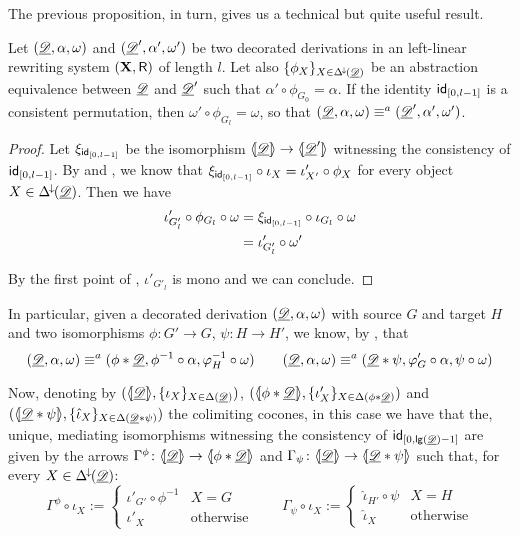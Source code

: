 The previous proposition, in turn, gives us a technical but quite useful result.

\begin{corollary}\label{cor:fromsemitocons}
			Let $(\underline{\mathscr{D}}, \alpha, \omega)$ and $(\underline{\mathscr{D}}', \alpha', \omega')$ be two decorated derivations in an left-linear rewriting system $(\textbf {\textup{X}}, \mathsf{R})$ of length $l$. Let also $\{\phi_X\}_{X\in \Delta^{\hspace{-1pt}\downarrow\hspace{-1pt}}(\underline{\mathscr{D}})}$ be an abstraction equivalence between $\underline{\mathscr{D}}$ and $\underline{\mathscr{D}}'$ such that  $\alpha'\circ \phi_{G_0}=\alpha$. If  the identity $\mathsf{id}_{[0,l-1]}$ is a consistent permutation, then $\omega'\circ \phi_{G_l}=\omega$, so that $(\underline{\mathscr{D}}, \alpha, \omega) \equiv^a (\underline{\mathscr{D}}', \alpha', \omega')$.
\end{corollary}
\begin{proof}
	Let $\xi_{\mathsf{id}_{[0, l-1]}}$ be the isomorphism $\langle \hspace{-1.85pt}[ \underline{\mathscr{D}}]\hspace{-1.85pt}\rangle\to \langle \hspace{-1.85pt}[\underline{\mathscr{D}}']\hspace{-1.85pt}\rangle$ witnessing the consistency of $\mathsf{id}_{[0, l-1]}$. By  and , we know that $\xi_{\mathsf{id}_{[0,l-1]}} \circ \iota_{X}= \iota'_{X'}\circ \phi_X$ for every object $X\in \Delta^{\hspace{-1pt}\downarrow\hspace{-1pt}}(\underline{\mathscr{D}})$. Then we have
	\begin{align*}
		\iota'_{ G'_{l}}\circ \phi_{G_l}\circ \omega&=\xi_{\mathsf{id}_{[0, l-1]}}\circ \iota_{G_l}\circ \omega\\&=\iota'_{G'_l}\circ \omega'
	\end{align*}
	
	By the first point of , $\iota'_{ G'_{l}}$ is mono and we can conclude.
\end{proof}


\begin{remark}\label{rem:abscons2}
	In particular, given a decorated derivation $(\underline{\mathscr{D}}, \alpha, \omega)$ with source $G$ and target $H$ and two isomorphisms $\phi\colon G'\to G$, $\psi\colon H\to H'$, we know, by , that 
	\[(\underline{\mathscr{D}}, \alpha, \omega) \equiv^a (\phi * \underline{\mathscr{D}}, \phi^{-1}\circ \alpha,   \varphi^{-1}_{H} \circ \omega) \qquad (\underline{\mathscr{D}}, \alpha, \omega) \equiv^a ( \underline{\mathscr{D}}*\psi, \varphi'_{G} \circ \alpha, \psi \circ \omega )\]
	
	Now, denoting by $(\langle \hspace{-1.85pt}[ \underline{\mathscr{D}}]\hspace{-1.85pt}\rangle, \{\iota_X\}_{X\in \Delta(\underline{\mathscr{D}})})$, $(\langle \hspace{-1.85pt}[ \phi *\underline{\mathscr{D}} ]\hspace{-1.85pt}\rangle, \{\iota'_X\}_{X\in \Delta(\phi *\underline{\mathscr{D}})})$ and $(\langle \hspace{-1.85pt}[ \underline{\mathscr{D}}*\psi ]\hspace{-1.85pt}\rangle, \{\hat{\iota}_X\}_{X\in \Delta(\underline{\mathscr{D}}*\psi)})$ the colimiting cocones, in this case we have that the, unique, mediating isomorphisms witnessing the consistency of $\mathsf{id}_{[0, \mathsf{lg}(\underline{\mathscr{D}})-1]}$ are given by the arrows $\Gamma^{\phi} \colon \langle \hspace{-1.85pt}[ \underline{\mathscr{D}}]\hspace{-1.85pt}\rangle\to \langle \hspace{-1.85pt}[ \phi*\underline{\mathscr{D}} ]\hspace{-1.85pt}\rangle$ and $\Gamma_\psi\colon \langle \hspace{-1.85pt}[ \underline{\mathscr{D}}]\hspace{-1.85pt}\rangle\to \langle \hspace{-1.85pt}[ \underline{\mathscr{D}}*\psi ]\hspace{-1.85pt}\rangle$  such that, for every $X\in \Delta^{\hspace{-1pt}\downarrow\hspace{-1pt}}(\underline{\mathscr{D}})$:
	\[\Gamma^\phi \circ \iota_X:=\begin{cases}
		\iota'_{G'}\circ \phi^{-1}  & X=G\\
		\iota'_X & \text{otherwise}
	\end{cases} \qquad \Gamma_\psi \circ \iota_X:=\begin{cases}
		\hat{\iota}_{H'}\circ \psi  & X=H\\
		\hat{\iota}_X & \text{otherwise}
	\end{cases}\]
\end{remark}


